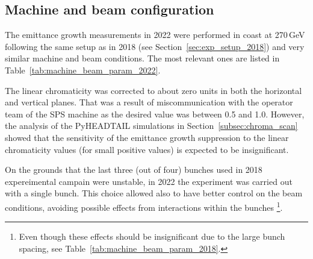 \subsection{Machine and beam configuration}\label{sec:cc_md_2022_parameters}
The emittance growth measurements in 2022 were performed in coast at 270\,GeV following the same setup as in 2018 (see Section~\ref{sec:exp_setup_2018}) and very similar machine and beam conditions. The most relevant ones are listed in Table~\ref{tab:machine_beam_param_2022}. 

The linear chromaticity was corrected to about zero units in both the horizontal and vertical planes. That was a result of miscommunication with the operator team of the SPS machine as the desired value was between 0.5 and 1.0. However, the analysis of the PyHEADTAIL simulations in Section~\ref{subsec:chroma_scan} showed that the sensitivity of the emittance growth suppression to the linear chromaticity values (for small positive values) is expected to be insignificant. 

On the grounds that the last three (out of four) bunches used in 2018 expereimental campain were unstable, in 2022 the experiment was carried out with a single bunch. This choice allowed also to have better control on the beam conditions, avoiding possible effects from interactions within the bunches \footnote{Even though these effects should be insignificant due to the large bunch spacing, see Table~\ref{tab:machine_beam_param_2018}.}.

